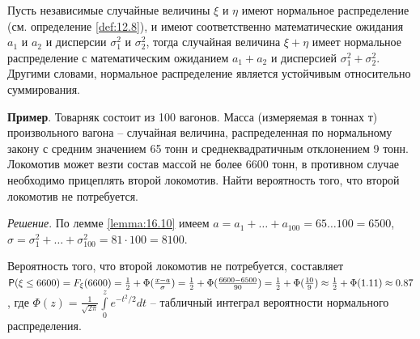 \begin{lemma}
\label{lemma:16.10}
Пусть независимые случайные величины $\xi$ и $\eta$ имеют
нормальное распределение (см. определение \ref{def:12.8}), и имеют соответственно математические ожидания $a_1$ и $a_2$ и дисперсии $\sigma_1^2$ и $\sigma_2^2$, тогда случайная величина $\xi + \eta$ имеет нормальное распределение с математическим ожиданием $a_1 + a_2$ и дисперсией $\sigma_1^2+\sigma_2^2$. Другими словами, нормальное распределение является устойчивым относительно суммирования.	
\end{lemma}

\textbf{Пример}. Товарняк состоит из 100 вагонов. Масса (измеряемая в тоннах т) произвольного вагона -- случайная величина, распределенная по нормальному закону с средним значением 65 тонн и среднеквадратичным отклонением 9 тонн. Локомотив может везти состав массой не более 6600 тонн, в противном случае необходимо прицеплять второй локомотив. Найти вероятность того, что второй локомотив не потребуется.

\textit{Решение}. По лемме \ref{lemma:16.10} имеем $a = a_1 + \ldots + a_{100} = 65 \ldots 100 = 6500$, $\sigma = \sigma_1^2 +\ldots+\sigma_{100}^2=81\cdot100 = 8100$.

Вероятность того, что второй локомотив не потребуется, составляет $\P(\xi \leq 6600) = F_\xi (6600)=\frac{1}{2}+\Phi(\frac{x-a}{\sigma})=\frac{1}{2}+\Phi(\frac{6600-6500}{90})=\frac{1}{2}+\Phi(\frac{10}{9})\approx\frac{1}{2}+\Phi(1.11)\approx0.87$, где $\Phi(z) = \frac{1}{\sqrt{2\pi}}\int\limits_0^z e^{-t^2/2}dt$ -- табличный интеграл вероятности нормального распределения. 